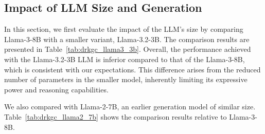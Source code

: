 \documentclass[11pt]{article}
\begin{document}
\subsection{Impact of LLM Size and Generation}\label{app:alternative modules}
In this section, we first evaluate the impact of the LLM's size by comparing Llama-3-8B with a smaller variant, Llama-3.2-3B. The comparison results are presented in Table~\ref{tab:drkgc_llama3_3b}. Overall, the performance achieved with the Llama-3.2-3B LLM is inferior compared to that of the Llama-3-8B, which is consistent with our expectations. This difference arises from the reduced number of parameters in the smaller model, inherently limiting its expressive power and reasoning capabilities.
\begin{table}[h]
    \centering
    \caption{DrKGC Performance with Llama-3.2-3B ($\Delta$ values indicate differences from Llama-3-8B).}
    \label{tab:drkgc_llama3_3b}
\end{table}

We also compared with Llama-2-7B, an earlier generation model of similar size. Table~\ref{tab:drkgc_llama2_7b} shows the comparison results relative to Llama-3-8B. 

\begin{table}[h]
    \centering
    \caption{DrKGC Performance with Llama-2-7B ($\Delta$ values indicate differences from Llama-3-8B).}
    \label{tab:drkgc_llama2_7b}
\end{table}
\end{document}
